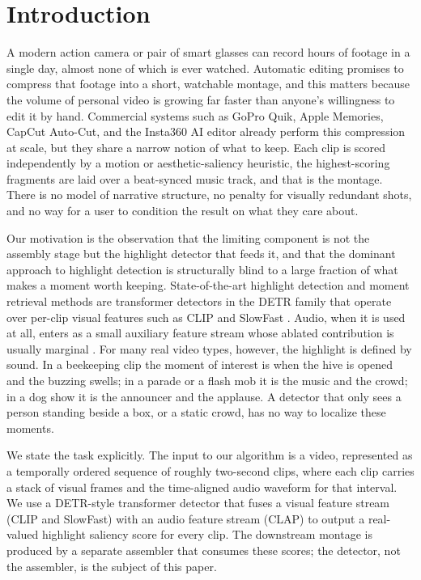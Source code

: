 \documentclass[10pt,twocolumn,letterpaper]{article}
\begin{document}
\section{Introduction}

A modern action camera or pair of smart glasses can record hours of footage in a single day, almost none of which is ever watched. Automatic editing promises to compress that footage into a short, watchable montage, and this matters because the volume of personal video is growing far faster than anyone's willingness to edit it by hand. Commercial systems such as GoPro Quik, Apple Memories, CapCut Auto-Cut, and the Insta360 AI editor already perform this compression at scale, but they share a narrow notion of what to keep. Each clip is scored independently by a motion or aesthetic-saliency heuristic, the highest-scoring fragments are laid over a beat-synced music track, and that is the montage. There is no model of narrative structure, no penalty for visually redundant shots, and no way for a user to condition the result on what they care about.

Our motivation is the observation that the limiting component is not the assembly stage but the highlight detector that feeds it, and that the dominant approach to highlight detection is structurally blind to a large fraction of what makes a moment worth keeping. State-of-the-art highlight detection and moment retrieval methods are transformer detectors in the DETR family that operate over per-clip visual features such as CLIP and SlowFast \cite{momentdetr,qddetr,cgdetr}. Audio, when it is used at all, enters as a small auxiliary feature stream whose ablated contribution is usually marginal \cite{qvhighlights}. For many real video types, however, the highlight is defined by sound. In a beekeeping clip the moment of interest is when the hive is opened and the buzzing swells; in a parade or a flash mob it is the music and the crowd; in a dog show it is the announcer and the applause. A detector that only sees a person standing beside a box, or a static crowd, has no way to localize these moments.

We state the task explicitly. The input to our algorithm is a video, represented as a temporally ordered sequence of roughly two-second clips, where each clip carries a stack of visual frames and the time-aligned audio waveform for that interval. We use a DETR-style transformer detector that fuses a visual feature stream (CLIP and SlowFast) with an audio feature stream (CLAP) to output a real-valued highlight saliency score for every clip. The downstream montage is produced by a separate assembler that consumes these scores; the detector, not the assembler, is the subject of this paper.
\end{document}
